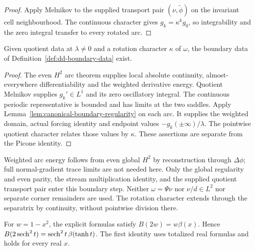 \begin{proof}
\leanok
Apply Melnikov to the supplied transport pair $(\nu,\widetilde\phi)$
on the invariant cell neighbourhood. The continuous character gives
$g_k=\kappa^kg_0$, so integrability and the zero integral transfer to
every rotated arc.
\end{proof}

\begin{lemma}
\label{lem:dd-boundary-regularity}
\leanok
Given quotient data at $\lambda\ne0$ and a rotation character $\kappa$ of
$\omega$, the boundary data of Definition~\ref{def:dd-boundary-data} exist.
\end{lemma}

\begin{proof}
\leanok
The even $H^2$ arc theorem supplies local absolute continuity,
almost-everywhere differentiability and the weighted derivative energy.
Quotient Melnikov supplies $g_k'\in L^1$ and its zero oscillatory integral.
The continuous periodic representative is bounded and has limits at the
two saddles. Apply Lemma~\ref{lem:canonical-boundary-regularity} on each arc.
It supplies the weighted domain, actual forcing identity and endpoint
values $-g_k(\pm\infty)/\lambda$. The pointwise quotient character relates
those values by $\kappa$. These assertions are separate from the Picone
identity.
\end{proof}

\begin{remark}
Weighted arc energy follows from even global $H^2$ by reconstruction
through $\Delta\phi$; full normal-gradient trace limits are not needed here.
Only the global regularity and even parity, the stream multiplication
identity, and the supplied quotient transport pair enter this boundary
step. Neither $\omega=\Psi\nu$ nor $\nu/d\in L^2$ nor separate corner
remainders are used. The rotation character extends through the
separatrix by continuity, without pointwise division there.
\end{remark}

\begin{lemma}
\label{lem:dd-boundaryB-beta}
\leanok
For $w=1-x^2$, the explicit formulas satisfy
$B(2w)=w\beta(x)$. Hence
$B(2\operatorname{sech}^2t)=\operatorname{sech}^2t\,\beta(\tanh t)$.
The first identity uses totalized real formulas and holds for every real $x$.
\end{lemma}

